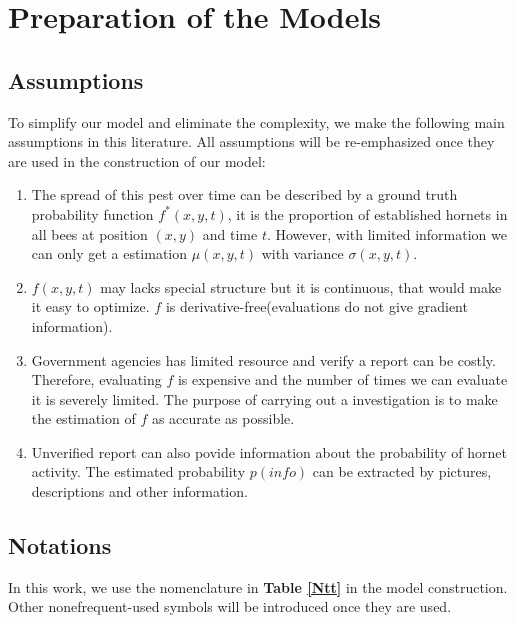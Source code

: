 \documentclass[12pt]{article}
\begin{document}
\section{Preparation of the Models}

\subsection{Assumptions}
To simplify our model and eliminate the complexity, we make the following main assumptions in this literature. All assumptions will be re-emphasized once they are used in the construction of our model:
\begin{enumerate}[\bfseries 1.]
	\item The spread of this pest over time can be described by a ground truth probability function $f^*(x,y,t)$, it is the proportion of established hornets in all bees at position $(x,y)$ and time $t$. However, with limited information we can only get a estimation $\mu(x,y,t)$ with variance $\sigma(x,y,t)$.
	\item $f(x,y,t)$ may lacks special structure but it is continuous, that would make it easy to optimize. $f$ is derivative-free(evaluations do not give gradient information).
	\item Government agencies has limited resource and verify a report can be costly. Therefore, evaluating $f$ is expensive and the number of times we can evaluate it is severely limited. The purpose of carrying out a investigation is to make the estimation of $f$ as accurate as possible.
	\item Unverified report can also povide information about the probability of hornet activity. The estimated probability $p(info)$ can be extracted by pictures, descriptions and other information.
\end{enumerate}
\subsection{Notations}
In this work, we use the nomenclature in  \textbf{Table \ref{Ntt}} in the model construction. Other nonefrequent-used symbols will be introduced once they are used.
\end{document}
